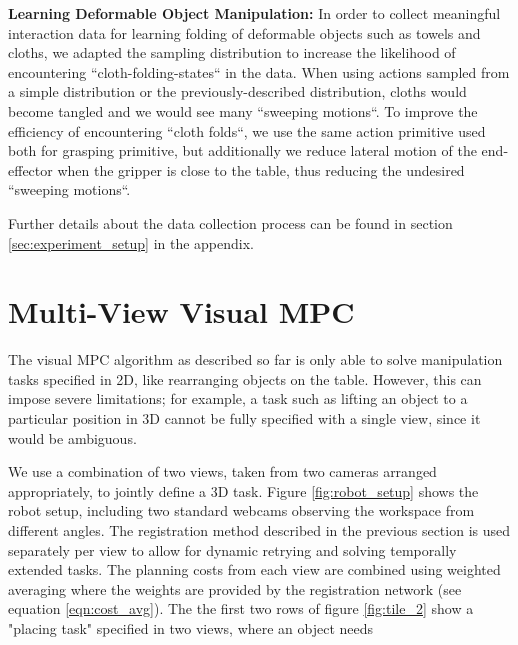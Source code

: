 \noindent \textbf{Learning Deformable Object Manipulation:}
In order to collect meaningful interaction data for learning folding of deformable objects such as towels and cloths, we adapted the sampling distribution to increase the likelihood of encountering ``cloth-folding-states`` in the data. When using actions sampled from a simple distribution or the previously-described distribution, cloths would become tangled and we would see many ``sweeping motions``. To improve the efficiency of encountering ``cloth folds``, we use the same action primitive used both for grasping primitive, but additionally we reduce lateral motion of the end-effector when the gripper is close to the table, thus reducing the undesired ``sweeping motions``.

Further details about the data collection process can be found in section \ref{sec:experiment_setup} in the appendix.

\section{Multi-View Visual MPC}
\label{sec:multiview}
The visual MPC algorithm as described so far is only able to solve manipulation tasks specified in 2D, like rearranging objects on the table. However, this can impose severe limitations; for example, a task such as lifting an object to a particular position in 3D cannot be fully specified with a single view, since it would be ambiguous. 

We use a combination of two views, taken from two cameras arranged appropriately, to jointly define a 3D task. Figure \ref{fig:robot_setup} shows the robot setup, including two standard webcams observing the workspace from different angles. The registration method described in the previous section is used separately per view to allow for dynamic retrying and solving temporally extended tasks. The planning costs from each view are combined using weighted averaging where the weights are provided by the registration network (see equation \ref{eqn:cost_avg}).  The the first two rows of figure \ref{fig:tile_2} show a "placing task" specified in two views, where an object needs 





